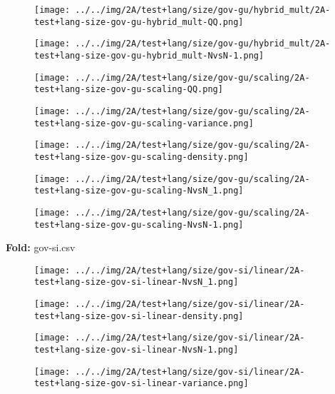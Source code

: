 \begin{figure}[H]
\centering	\texttt{[image: ../../img/2A/test+lang/size/gov-gu/hybrid\_mult/2A-test+lang-size-gov-gu-hybrid\_mult-QQ.png]}
\end{figure}
\begin{figure}[H]
\centering	\texttt{[image: ../../img/2A/test+lang/size/gov-gu/hybrid\_mult/2A-test+lang-size-gov-gu-hybrid\_mult-NvsN-1.png]}
\end{figure}
\begin{figure}[H]
\centering	\texttt{[image: ../../img/2A/test+lang/size/gov-gu/scaling/2A-test+lang-size-gov-gu-scaling-QQ.png]}
\end{figure}
\begin{figure}[H]
\centering	\texttt{[image: ../../img/2A/test+lang/size/gov-gu/scaling/2A-test+lang-size-gov-gu-scaling-variance.png]}
\end{figure}
\begin{figure}[H]
\centering	\texttt{[image: ../../img/2A/test+lang/size/gov-gu/scaling/2A-test+lang-size-gov-gu-scaling-density.png]}
\end{figure}
\begin{figure}[H]
\centering	\texttt{[image: ../../img/2A/test+lang/size/gov-gu/scaling/2A-test+lang-size-gov-gu-scaling-NvsN\_1.png]}
\end{figure}
\begin{figure}[H]
\centering	\texttt{[image: ../../img/2A/test+lang/size/gov-gu/scaling/2A-test+lang-size-gov-gu-scaling-NvsN-1.png]}
\end{figure}
\textbf{Fold:} gov-si.csv
\begin{figure}[H]
\centering	\texttt{[image: ../../img/2A/test+lang/size/gov-si/linear/2A-test+lang-size-gov-si-linear-NvsN\_1.png]}
\end{figure}
\begin{figure}[H]
\centering	\texttt{[image: ../../img/2A/test+lang/size/gov-si/linear/2A-test+lang-size-gov-si-linear-density.png]}
\end{figure}
\begin{figure}[H]
\centering	\texttt{[image: ../../img/2A/test+lang/size/gov-si/linear/2A-test+lang-size-gov-si-linear-NvsN-1.png]}
\end{figure}
\begin{figure}[H]
\centering	\texttt{[image: ../../img/2A/test+lang/size/gov-si/linear/2A-test+lang-size-gov-si-linear-variance.png]}
\end{figure}

